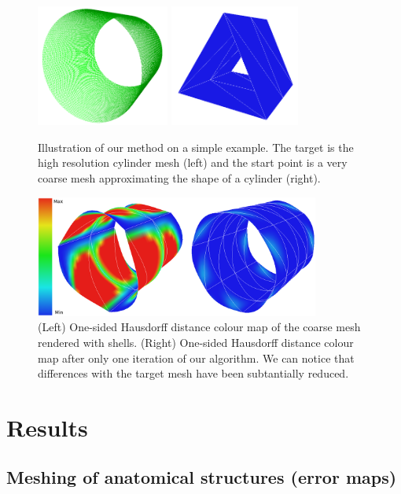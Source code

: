 \documentclass{llncs}
\begin{document}
\begin{figure}
\centering
\includegraphics[height=4cm]{images/cylinderHighWireframe}
\includegraphics[height=4cm]{images/cylinderLow}
\caption {Illustration of our method on a simple example. The target is the high resolution cylinder mesh (left) and the start point is a very coarse mesh approximating the shape of a cylinder (right).}
\label{fig-cylinder}
\end{figure}
\begin{figure}
\centering
\includegraphics[height=4cm]{images/cylinderResults2}
\caption {(Left) One-sided Hausdorff distance colour map of the coarse mesh rendered with shells. (Right) One-sided Hausdorff distance colour map after only one iteration of our algorithm. We can notice that differences with the target mesh have been subtantially reduced.}
\label{fig-cylinderResults}
\end{figure}

\section{Results}
\label{sec:results}
\subsection{Meshing of anatomical structures (error maps)}
\end{document}
